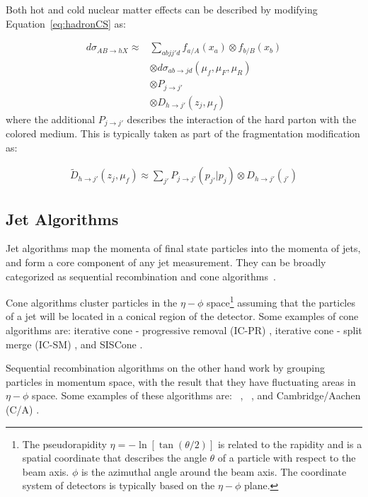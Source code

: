 Both hot and cold nuclear matter effects can be described by modifying Equation~\ref{eq:hadronCS} as:

\begin{align}
d \sigma_{AB \rightarrow hX}  \approx & \sum_{abjj'd} f_{a/A} (x_a) \otimes f_{b/B} (x_b) \\ 
& \otimes d\sigma_{ab\rightarrow jd} (\mu_f, \mu_F, \mu_R)  \nonumber \\
& \otimes P_{j\rightarrow j'} \nonumber \\
& \otimes D_{h \rightarrow j'} (z_j, \mu_f) \nonumber 
\end{align}
where the additional $P_{j\rightarrow j'}$ describes the interaction of the hard parton with the colored medium.
This is typically taken as part of the fragmentation modification as:

\begin{align}
\widetilde{D}_{h \rightarrow j'} (z_j, \mu_f) \approx \sum_{j'} P_{j\rightarrow j'} (p_{j'} | p_j) \otimes D_{h\rightarrow j'} (_{j'})
\end{align}




\subsection{Jet Algorithms}
\label{sec:jet_algo}
Jet algorithms map the momenta of final state particles into the momenta of jets, and form a core component of any jet measurement.
They can be broadly categorized as sequential recombination and cone algorithms~\cite{Atkin_2015}. 

Cone algorithms cluster particles in the $\eta-\phi$ space\footnote{The pseudorapidity $\eta = -\ln [\tan(\theta/2)]$ is related to the rapidity and is a spatial coordinate that describes the angle $\theta$ of a particle with respect to the beam axis. $\phi$ is the azimuthal angle around the beam axis. The coordinate system of detectors is typically based on the $\eta-\phi$ plane.} assuming that the particles of a jet will be located in a conical region of the detector.
Some examples of cone algorithms are: iterative cone - progressive removal (IC-PR) \cite{ARNISON1983214}, iterative cone - split merge (IC-SM) \cite{Blazey:2000qt}, and SISCone \cite{Salam_2007}.

Sequential recombination algorithms on the other hand work by grouping particles in momentum space, with the result that they have fluctuating areas in $\eta-\phi$ space.
Some examples of these algorithms are: \kt\ \cite{Catani:1993hr}, \antikt\ \cite{Cacciari:2008gp}, and Cambridge/Aachen (C/A) \cite{Dokshitzer:1997in}.

